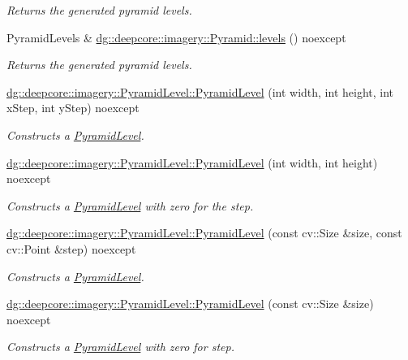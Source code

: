 \begin{DoxyCompactItemize}
\begin{DoxyCompactList}\small\item\em Returns the generated pyramid levels. \end{DoxyCompactList}\item 
Pyramid\+Levels \& \hyperlink{group___imagery_module_gacabef885d8fcdf548631bcf134e17298}{dg\+::deepcore\+::imagery\+::\+Pyramid\+::levels} () noexcept
\begin{DoxyCompactList}\small\item\em Returns the generated pyramid levels. \end{DoxyCompactList}\item 
\hyperlink{group___imagery_module_ga6e5a71cc3c52efc7890ebb8d2151b35d}{dg\+::deepcore\+::imagery\+::\+Pyramid\+Level\+::\+Pyramid\+Level} (int width, int height, int x\+Step, int y\+Step) noexcept
\begin{DoxyCompactList}\small\item\em Constructs a \hyperlink{structdg_1_1deepcore_1_1imagery_1_1_pyramid_level}{Pyramid\+Level}. \end{DoxyCompactList}\item 
\hyperlink{group___imagery_module_ga9675c2d85800ca99ea908f26996dbcc1}{dg\+::deepcore\+::imagery\+::\+Pyramid\+Level\+::\+Pyramid\+Level} (int width, int height) noexcept
\begin{DoxyCompactList}\small\item\em Constructs a \hyperlink{structdg_1_1deepcore_1_1imagery_1_1_pyramid_level}{Pyramid\+Level} with zero for the step. \end{DoxyCompactList}\item 
\hyperlink{group___imagery_module_gab23e577c28dd7a700976dc26cef3db76}{dg\+::deepcore\+::imagery\+::\+Pyramid\+Level\+::\+Pyramid\+Level} (const cv\+::\+Size \&size, const cv\+::\+Point \&step) noexcept
\begin{DoxyCompactList}\small\item\em Constructs a \hyperlink{structdg_1_1deepcore_1_1imagery_1_1_pyramid_level}{Pyramid\+Level}. \end{DoxyCompactList}\item 
\hyperlink{group___imagery_module_ga64dc65f27bed7bb4888bc0375eb9d99a}{dg\+::deepcore\+::imagery\+::\+Pyramid\+Level\+::\+Pyramid\+Level} (const cv\+::\+Size \&size) noexcept
\begin{DoxyCompactList}\small\item\em Constructs a \hyperlink{structdg_1_1deepcore_1_1imagery_1_1_pyramid_level}{Pyramid\+Level} with zero for step. \end{DoxyCompactList}\item 

\end{DoxyCompactItemize}
